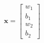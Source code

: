 \documentclass[preview]{standalone}
\begin{document}
\begin{align*}
\textbf{x} = \begin{bmatrix} w_1\\ b_1\\w_2\\ b_2 \end{bmatrix}
\end{align*}
\end{document}
